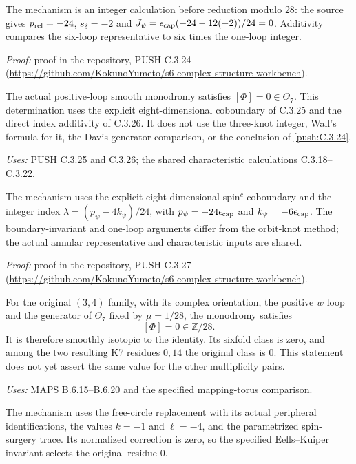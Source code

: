 The mechanism is an integer calculation before reduction modulo $28$: the source gives $p_{\rm rel}=-24$, $s_\delta=-2$ and $J_\psi=\epsilon_{\rm cap}(-24-12(-2))/24=0$. Additivity compares the six-loop representative to six times the one-loop integer.

\noindent\emph{Proof:} proof in the repository, PUSH C.3.24 (\url{https://github.com/KokunoYumeto/s6-complex-structure-workbench}).

\begin{announcement}[PUSH C.3.27; A]\label{push:C.3.27}
The actual positive-loop smooth monodromy satisfies
$[\Phi]=0\in\Theta_7$. This determination uses the explicit
eight-dimensional coboundary of C.3.25 and the direct index
additivity of C.3.26. It does not use the three-knot integer,
Wall's formula for it, the Davis generator comparison, or the
conclusion of \ref{push:C.3.24}.
\end{announcement}
\noindent\emph{Uses:} PUSH C.3.25 and C.3.26; the shared characteristic calculations C.3.18--C.3.22.\par

The mechanism uses the explicit eight-dimensional spin$^c$ coboundary and the integer index $\lambda=(p_\psi-4k_\psi)/24$, with $p_\psi=-24\epsilon_{\rm cap}$ and $k_\psi=-6\epsilon_{\rm cap}$. The boundary-invariant and one-loop arguments differ from the orbit-knot method; the actual annular representative and characteristic inputs are shared.

\noindent\emph{Proof:} proof in the repository, PUSH C.3.27 (\url{https://github.com/KokunoYumeto/s6-complex-structure-workbench}).

\begin{announcement}[MAPS B.6.21; A]\label{maps:B.6.21}
For the original $(3,4)$ family, with its complex orientation,
the positive $w$ loop and the generator of $\Theta_7$ fixed by
$\mu=1/28$, the monodromy satisfies
\[
                         [\Phi]=0\in\mathbb Z/28.
 \tag{B.6.38}
\]
It is therefore smoothly isotopic to the identity.  Its sixfold
class is zero, and among the two resulting K7 residues $0,14$
the original class is $0$.  This statement does not yet assert
the same value for the other multiplicity pairs.
\end{announcement}
\noindent\emph{Uses:} MAPS B.6.15--B.6.20 and the specified mapping-torus comparison.\par

The mechanism uses the free-circle replacement with its actual peripheral identifications, the values $k=-1$ and $\ell=-4$, and the parametrized spin-surgery trace. Its normalized correction is zero, so the specified Eells--Kuiper invariant selects the original residue $0$.

